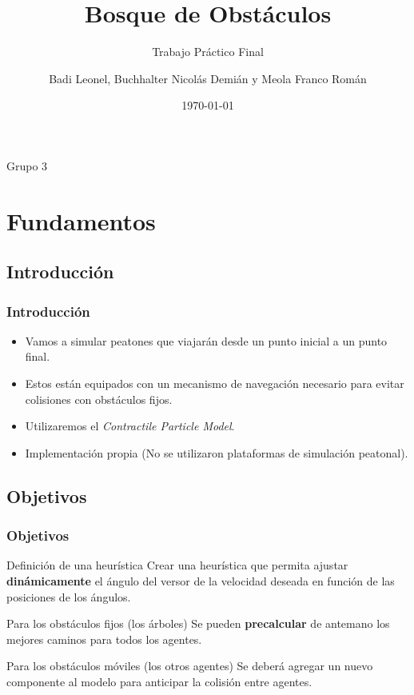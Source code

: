 \documentclass[hyperref={pdfpagelayout=SinglePage}]{beamer}
\title{Bosque de Obstáculos}
\subtitle{Trabajo Práctico Final}
\author{Badi Leonel, Buchhalter Nicolás Demián y Meola Franco Román}
\date{\today}
\makeatletter
\newcommand{\parttableofcontents}{\@starttoc{parttoc}}
\makeatother
\begin{document}
\begin{frame}[plain]
    \frametitle{} 
    \titlepage
    \centering
	Grupo 3
\end{frame}



\section{Fundamentos}

\subsection{Introducción}

\begin{frame}
\frametitle{Introducción}
\begin{itemize}
	\item Vamos a simular peatones que viajarán desde un punto inicial a un punto final.
	\item Estos están equipados con un mecanismo de navegación necesario para evitar colisiones con obstáculos fijos.
	\item Utilizaremos el \textit{Contractile Particle Model}.
	\item Implementación propia (No se utilizaron plataformas de simulación peatonal).
\end{itemize}
\end{frame}

\subsection{Objetivos}

\begin{frame}
\frametitle{Objetivos}
\begin{block}{Definición de una heurística}
Crear una heurística que permita ajustar \textbf{dinámicamente} el ángulo del versor de la velocidad deseada en función de las posiciones de los ángulos.
\end{block}
\begin{exampleblock}{Para los obstáculos fijos (los árboles)}
Se pueden \textbf{precalcular} de antemano los mejores caminos para todos los agentes.
\end{exampleblock}
\begin{alertblock}{Para los obstáculos móviles (los otros agentes)}
Se deberá agregar un nuevo componente al modelo para anticipar la colisión entre agentes.
\end{alertblock}
\end{frame}
\end{document}
